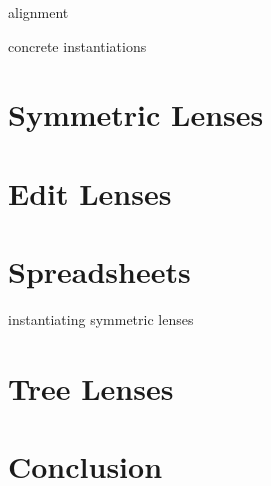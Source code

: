 \documentclass[12pt]{report}
\numberwithin{equation}{section}
\begin{document}
alignment

concrete instantiations

\chapter{Symmetric Lenses}



\chapter{Edit Lenses}

\mlinjargs\mlinjnoargs

\chapter{Spreadsheets}

instantiating symmetric lenses

\chapter{Tree Lenses}



\chapter{Conclusion}

%
\end{document}

